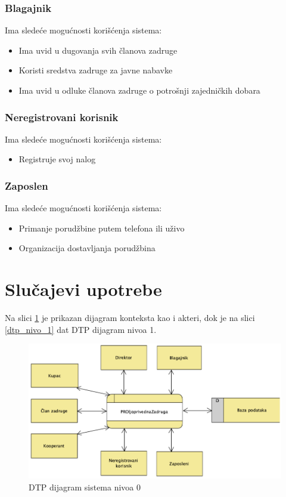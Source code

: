 \documentclass[a4paper]{article}
\begin{document}
\subsubsection{Blagajnik}
\indent Ima sledeće mogućnosti korišćenja sistema:
\begin{itemize}
    \item Ima uvid u dugovanja svih članova zadruge
    \item Koristi sredstva zadruge za javne nabavke
    \item Ima uvid u odluke članova zadruge o potrošnji zajedničkih dobara
\end{itemize}

\subsubsection{Neregistrovani korisnik}
\indent Ima sledeće mogućnosti korišćenja sistema:
\begin{itemize}
    \item Registruje svoj nalog
\end{itemize}

\subsubsection{Zaposlen}
\indent Ima sledeće mogućnosti korišćenja sistema:
\begin{itemize}
    \item Primanje porudžbine putem telefona ili uživo
    \item Organizacija dostavljanja porudžbina
\end{itemize}

\newpage

\section{Slučajevi upotrebe}
Na slici \ref{dtp_nivo_0} je prikazan dijagram konteksta kao i akteri, dok je na slici \ref{dtp_nivo_1} dat DTP dijagram nivoa 1.
\begin{figure}[h!]
    \centering
    \includegraphics[scale=0.72]{images/dtp_nivo_0.png}
    \caption{DTP dijagram sistema nivoa 0}
    \label{dtp_nivo_0}
\end{figure}
\end{document}
